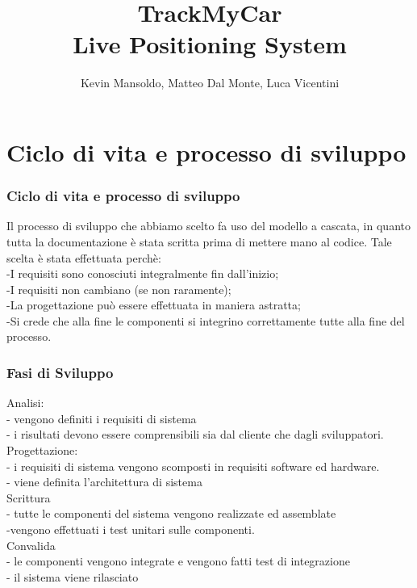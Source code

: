 \documentclass[a4paper,12pt]{beamer}
\begin{document}
\title{\textbf{TrackMyCar \\ Live Positioning System}}

\author{Kevin Mansoldo, Matteo Dal Monte, Luca Vicentini}
\date{}
\maketitle
\pagebreak




\section{Ciclo di vita e processo di sviluppo}
\begin{frame}
\frametitle{Ciclo di vita e processo di sviluppo}
Il processo di sviluppo che abbiamo scelto fa uso del modello a cascata, in quanto tutta la documentazione è stata scritta prima di mettere mano al codice. Tale scelta è stata effettuata perchè:\\
-I requisiti sono conosciuti integralmente fin dall’inizio;\\
-I requisiti non cambiano (se non raramente);\\
-La progettazione può essere effettuata in maniera astratta;\\
-Si crede che alla fine le componenti si integrino correttamente tutte alla fine del processo.\\
\end{frame}

\begin{frame}
\frametitle{Fasi di Sviluppo}
Analisi:\\
- vengono definiti i requisiti di sistema\\
- i risultati devono essere comprensibili sia dal cliente che dagli sviluppatori.\\
Progettazione:\\
- i requisiti di sistema vengono scomposti in requisiti software ed hardware.\\
- viene definita l’architettura di sistema\\
Scrittura \\
- tutte le componenti del sistema vengono realizzate ed assemblate  \\
-vengono effettuati i test unitari sulle componenti.\\
Convalida\\
- le componenti vengono integrate e vengono fatti test di integrazione\\
- il sistema viene rilasciato\\
\end{frame}
\end{document}
